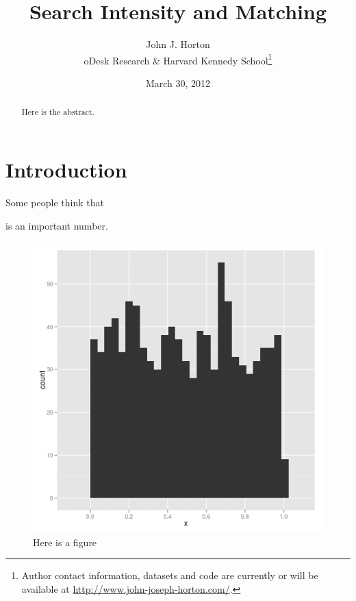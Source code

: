 \documentclass[11pt]{article}
\begin{document}
 

\title{Search Intensity and Matching}
\date{March 30, 2012}

\author{John J. Horton \\ oDesk Research \& Harvard Kennedy
  School\footnote{Author contact information, datasets and code are
    currently or will be available at
    \href{http://www.john-joseph-horton.com/}{http://www.john-joseph-horton.com/}.}}
\maketitle
\begin{abstract}
  Here is the abstract. 
\end{abstract} 

\section{Introduction}
Some people think that 

is an important number. 

\begin{figure}[h]
  \centering
  \includegraphics[scale=1]{./plots/hist.png}
  \caption{Here is a figure}
  \label{fig:hist}
\end{figure}




\end{document}
